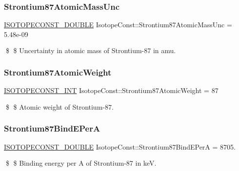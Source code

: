 \subsubsection{\texorpdfstring{Strontium87\+Atomic\+Mass\+Unc}{Strontium87AtomicMassUnc}}
{\footnotesize\ttfamily \mbox{\hyperlink{group___isotope_const-_macros_ga8f45a7272ce02c0b4c65c44636ed719a}{I\+S\+O\+T\+O\+P\+E\+C\+O\+N\+S\+T\+\_\+\+D\+O\+U\+B\+LE}} Isotope\+Const\+::\+Strontium87\+Atomic\+Mass\+Unc = 5.\+48e-\/09}

\$ \$ Uncertainty in atomic mass of Strontium-\/87 in amu. \mbox{\label{group___isotope_const-_strontium-_sr87_gae5ae708ee39dd0b7afae42c1134fc5f6}} 
\subsubsection{\texorpdfstring{Strontium87\+Atomic\+Weight}{Strontium87AtomicWeight}}
{\footnotesize\ttfamily \mbox{\hyperlink{group___isotope_const-_macros_ga5f18360b3e99483a35c32d789e62621c}{I\+S\+O\+T\+O\+P\+E\+C\+O\+N\+S\+T\+\_\+\+I\+NT}} Isotope\+Const\+::\+Strontium87\+Atomic\+Weight = 87}

\$ \$ Atomic weight of Strontium-\/87. \mbox{\label{group___isotope_const-_strontium-_sr87_gac5e9188fcea6d61d846c8e413f4b72e8}} 
\subsubsection{\texorpdfstring{Strontium87\+Bind\+E\+PerA}{Strontium87BindEPerA}}
{\footnotesize\ttfamily \mbox{\hyperlink{group___isotope_const-_macros_ga8f45a7272ce02c0b4c65c44636ed719a}{I\+S\+O\+T\+O\+P\+E\+C\+O\+N\+S\+T\+\_\+\+D\+O\+U\+B\+LE}} Isotope\+Const\+::\+Strontium87\+Bind\+E\+PerA = 8705.}

\$ \$ Binding energy per A of Strontium-\/87 in keV. \mbox{\label{group___isotope_const-_strontium-_sr87_ga08e586aadc01d371dfaeaf0e4f78538b}} 
